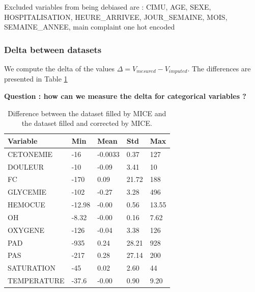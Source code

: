 \documentclass{article}
\begin{document}
            Excluded variables from being debiased are : CIMU, AGE, SEXE, HOSPITALISATION, HEURE\_ARRIVEE, JOUR\_SEMAINE, MOIS, SEMAINE\_ANNEE, main complaint one hot encoded
            
            \subsubsection{Delta between datasets}
                We compute the delta of the values $\Delta = V_{mesured} - V_{imputed}$. The differences are presented in Table \ref{tab:delta}

                \textbf{Question : how can we measure the delta for categorical variables ?}

                \begin{table}
                    \centering
                    \begin{tabular}{lllll}
                        \toprule
                        Variable & Min & Mean & Std & Max \\
                        \midrule
                        CETONEMIE & -16 & -0.0033 & 0.37 & 127 \\
                        DOULEUR & -10 & -0.09 & 3.41 & 10 \\
                        FC & -170 & 0.09 & 21.72 & 188 \\
                        GLYCEMIE & -102 & -0.27 & 3.28 & 496 \\
                        HEMOCUE & -12.98 & -0.00 & 0.56 & 13.55 \\
                        OH & -8.32 & -0.00 & 0.16 & 7.62 \\
                        OXYGENE & -126 & -0.04 & 3.38 & 126 \\
                        PAD & -935 & 0.24 & 28.21 & 928 \\
                        PAS & -217 & 0.28 & 27.14 & 200 \\
                        SATURATION & -45 & 0.02 & 2.60 & 44 \\
                        TEMPERATURE& -37.6 & -0.00 & 0.90 & 9.20 \\
                        \bottomrule
                    \end{tabular}
                    \caption{Difference between the dataset filled by MICE and the dataset filled and corrected by MICE.}
                    \label{tab:delta}
                \end{table}
            
\end{document}
